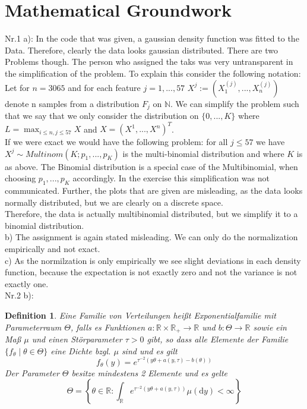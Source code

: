 \documentclass[a4paper,oneside,bibliography=totoc]{scrartcl}
\newtheorem{defn}{Definition}[section] %
\begin{document}



\appendix
\section{Mathematical Groundwork}
Nr.1 a): In the code that was given, a gaussian density function was fitted to the Data. Therefore, clearly the data looks gaussian distributed. There are two Problems though. The person who assigned the taks was very untransparent in the simplification of the problem. To explain this consider the following notation:\\
Let for $n=3065$ and for each feature $j=1,...,57$ $X^j := (X_1^{(j)},...,X_n^{(j)})$ denote n samples from a distribution $F_j$ on $\mathbb{N}$. We can simplify the problem such that we say that we only consider the distribution on $\{ 0,..., K \}$ where $L=\max_{i\leq n , j \leq 57} X$ and $X= (X^1,...,X^n)^T$.\\
If we were exact we would have the following problem: for all $j \leq 57$ we have $X^j \sim Multinom(K;p_1,...,p_K)$ is the multi-binomial distribution and where $K$ is as above. The Binomial distribution is a special case of the Multibinomial, when choosing $p_1,...,p_K$ accordingly. In the exercise this simplification was not communicated. Further, the plots that are given are misleading, as the data looks normally distributed, but we are clearly on a discrete space.\\
Therefore, the data is actually multibinomial distributed, but we simplify it to a binomial distribution.\\
b) The assignment is again stated misleading. We can only do the normalization empirically and not exact.\\
c) As the normilzation is only empirically we see slight deviations in each density function, because the expectation is not exactly zero and not the variance is not exactly one.\\
Nr.2 b):
\begin{defn}
     Eine Familie von Verteilungen heißt Exponentialfamilie mit Parameterraum $\Theta$, falls es Funktionen $a: \mathbb{R} \times \mathbb{R}_{+} \rightarrow \mathbb{R}$ und $b: \Theta \rightarrow \mathbb{R}$ sowie ein Maß $\mu$ und einen Störparameter $\tau>0$ gibt, so dass alle Elemente der Familie $\{ f_\theta \mid \theta \in \Theta\}$ eine Dichte bzgl. $\mu$ sind  und es gilt
$$
f_\theta(y)=e^{\tau^{-2}(y \theta+a(y, \tau)-b(\theta))}
$$
Der Parameter $\Theta$ besitze mindestens 2 Elemente und es gelte
$$
\Theta=\left\{\theta \in \mathbb{R}: \int_{\mathbb{R}} e^{\tau^{-2}(y \theta+a(y, \tau))} \mu(\mathrm{d} y)<\infty\right\}
$$
\end{defn}
\end{document}
